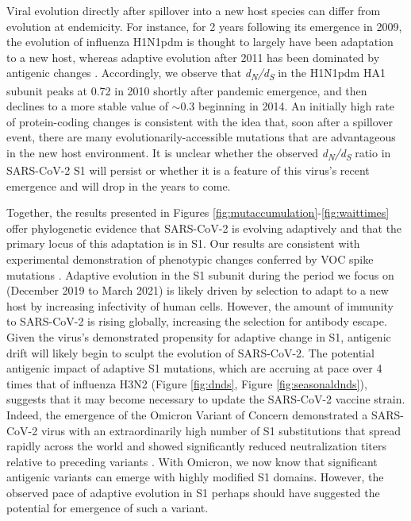 \documentclass[11pt,oneside,letterpaper]{article}
\newcommand{\dnds}{\emph{d\textsubscript{N}/d\textsubscript{S}}}
\begin{document}
Viral evolution directly after spillover into a new host species can differ from evolution at endemicity.
For instance, for 2 years following its emergence in 2009, the evolution of influenza H1N1pdm is thought to largely have been adaptation to a new host, whereas adaptive evolution after 2011 has been dominated by antigenic changes \cite{Su2015-az}.
Accordingly, we observe that \dnds{} in the H1N1pdm HA1 subunit peaks at 0.72 in 2010 shortly after pandemic emergence, and then declines to a more stable value of $\sim$0.3 beginning in 2014.
An initially high rate of protein-coding changes is consistent with the idea that, soon after a spillover event, there are many evolutionarily-accessible mutations that are advantageous in the new host environment.
It is unclear whether the observed \dnds{} ratio in SARS-CoV-2 S1 will persist or whether it is a feature of this virus's recent emergence and will drop in the years to come.

Together, the results presented in Figures \ref{fig:mutaccumulation}-\ref{fig:waittimes} offer phylogenetic evidence that SARS-CoV-2 is evolving adaptively and that the primary locus of this adaptation is in S1.
Our results are consistent with experimental demonstration of phenotypic changes conferred by VOC spike mutations \cite{Wang2021-dm, Greaney2021-jn, Li2020-jd, Liu2021-ne}.
Adaptive evolution in the S1 subunit during the period we focus on (December 2019 to March 2021) is likely driven by selection to adapt to a new host by increasing infectivity of human cells.
However, the amount of immunity to SARS-CoV-2 is rising globally, increasing the selection for antibody escape.
Given the virus's demonstrated propensity for adaptive change in S1, antigenic drift will likely begin to sculpt the evolution of SARS-CoV-2.
The potential antigenic impact of adaptive S1 mutations, which are accruing at pace over 4 times that of influenza H3N2 (Figure \ref{fig:dnds}, Figure \ref{fig:seasonaldnds}), suggests that it may become necessary to update the SARS-CoV-2 vaccine strain.
Indeed, the emergence of the Omicron Variant of Concern demonstrated a SARS-CoV-2 virus with an extraordinarily high number of S1 substitutions \cite{viana2021rapid} that spread rapidly across the world and showed significantly reduced neutralization titers  relative to preceding variants \cite{cele2021omicron}.
With Omicron, we now know that significant antigenic variants can emerge with highly modified S1 domains.
However, the observed pace of adaptive evolution in S1 perhaps should have suggested the potential for emergence of such a variant.
\end{document}
